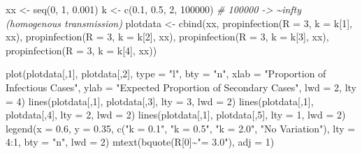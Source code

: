 \documentclass[
]{article}
\newenvironment{Shaded}{\begin{snugshade}}{\end{snugshade}}
\newcommand{\AttributeTok}[1]{\textcolor[rgb]{0.77,0.63,0.00}{#1}}
\newcommand{\CommentTok}[1]{\textcolor[rgb]{0.56,0.35,0.01}{\textit{#1}}}
\newcommand{\DecValTok}[1]{\textcolor[rgb]{0.00,0.00,0.81}{#1}}
\newcommand{\FloatTok}[1]{\textcolor[rgb]{0.00,0.00,0.81}{#1}}
\newcommand{\FunctionTok}[1]{\textcolor[rgb]{0.00,0.00,0.00}{#1}}
\newcommand{\NormalTok}[1]{#1}
\newcommand{\OtherTok}[1]{\textcolor[rgb]{0.56,0.35,0.01}{#1}}
\newcommand{\SpecialCharTok}[1]{\textcolor[rgb]{0.00,0.00,0.00}{#1}}
\newcommand{\StringTok}[1]{\textcolor[rgb]{0.31,0.60,0.02}{#1}}
\begin{document}
\begin{Shaded}
\begin{Highlighting}[]
\NormalTok{xx }\OtherTok{\textless{}{-}} \FunctionTok{seq}\NormalTok{(}\DecValTok{0}\NormalTok{, }\DecValTok{1}\NormalTok{, }\FloatTok{0.001}\NormalTok{)}
\NormalTok{k }\OtherTok{\textless{}{-}} \FunctionTok{c}\NormalTok{(}\FloatTok{0.1}\NormalTok{, }\FloatTok{0.5}\NormalTok{, }\DecValTok{2}\NormalTok{, }\DecValTok{100000}\NormalTok{) }\CommentTok{\# 100000 {-}\textgreater{} \textasciitilde{}infty (homogenous transmission)}
\NormalTok{plotdata }\OtherTok{\textless{}{-}} \FunctionTok{cbind}\NormalTok{(xx, }
                  \FunctionTok{propinfection}\NormalTok{(}\AttributeTok{R =} \DecValTok{3}\NormalTok{, }\AttributeTok{k =}\NormalTok{ k[}\DecValTok{1}\NormalTok{], xx),}
                  \FunctionTok{propinfection}\NormalTok{(}\AttributeTok{R =} \DecValTok{3}\NormalTok{, }\AttributeTok{k =}\NormalTok{ k[}\DecValTok{2}\NormalTok{], xx),}
                  \FunctionTok{propinfection}\NormalTok{(}\AttributeTok{R =} \DecValTok{3}\NormalTok{, }\AttributeTok{k =}\NormalTok{ k[}\DecValTok{3}\NormalTok{], xx),}
                  \FunctionTok{propinfection}\NormalTok{(}\AttributeTok{R =} \DecValTok{3}\NormalTok{, }\AttributeTok{k =}\NormalTok{ k[}\DecValTok{4}\NormalTok{], xx))}

                            
\FunctionTok{plot}\NormalTok{(plotdata[,}\DecValTok{1}\NormalTok{], plotdata[,}\DecValTok{2}\NormalTok{], }\AttributeTok{type =} \StringTok{"l"}\NormalTok{, }\AttributeTok{bty =} \StringTok{"n"}\NormalTok{,}
     \AttributeTok{xlab =} \StringTok{"Proportion of Infectious Cases"}\NormalTok{,}
     \AttributeTok{ylab =} \StringTok{"Expected Proportion of Secondary Cases"}\NormalTok{,}
     \AttributeTok{lwd =} \DecValTok{2}\NormalTok{, }\AttributeTok{lty =} \DecValTok{4}\NormalTok{)}
\FunctionTok{lines}\NormalTok{(plotdata[,}\DecValTok{1}\NormalTok{], plotdata[,}\DecValTok{3}\NormalTok{], }\AttributeTok{lty =} \DecValTok{3}\NormalTok{, }\AttributeTok{lwd =} \DecValTok{2}\NormalTok{)}
\FunctionTok{lines}\NormalTok{(plotdata[,}\DecValTok{1}\NormalTok{], plotdata[,}\DecValTok{4}\NormalTok{], }\AttributeTok{lty =} \DecValTok{2}\NormalTok{, }\AttributeTok{lwd =} \DecValTok{2}\NormalTok{)}
\FunctionTok{lines}\NormalTok{(plotdata[,}\DecValTok{1}\NormalTok{], plotdata[,}\DecValTok{5}\NormalTok{], }\AttributeTok{lty =} \DecValTok{1}\NormalTok{, }\AttributeTok{lwd =} \DecValTok{2}\NormalTok{)}
\FunctionTok{legend}\NormalTok{(}\AttributeTok{x =} \FloatTok{0.6}\NormalTok{, }\AttributeTok{y =} \FloatTok{0.35}\NormalTok{, }\FunctionTok{c}\NormalTok{(}\StringTok{"k = 0.1"}\NormalTok{, }\StringTok{"k = 0.5"}\NormalTok{, }\StringTok{"k = 2.0"}\NormalTok{, }\StringTok{"No Variation"}\NormalTok{), }
       \AttributeTok{lty =} \DecValTok{4}\SpecialCharTok{:}\DecValTok{1}\NormalTok{, }\AttributeTok{bty =} \StringTok{"n"}\NormalTok{, }\AttributeTok{lwd =} \DecValTok{2}\NormalTok{)}
\FunctionTok{mtext}\NormalTok{(}\FunctionTok{bquote}\NormalTok{(R[}\DecValTok{0}\NormalTok{]}\SpecialCharTok{\textasciitilde{}}\StringTok{"= 3.0"}\NormalTok{), }\AttributeTok{adj =} \DecValTok{1}\NormalTok{)}
\end{Highlighting}
\end{Shaded}
\end{document}
